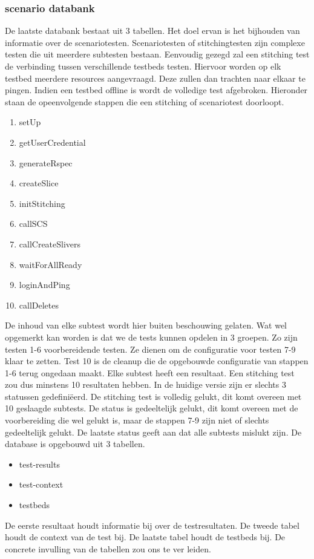\subsubsection{scenario databank}
\npar
De laatste databank bestaat uit 3 tabellen. Het doel ervan is het bijhouden van informatie over de scenariotesten. Scenariotesten of stitchingtesten zijn complexe testen die uit meerdere subtesten bestaan. Eenvoudig gezegd zal een stitching test de verbinding tussen verschillende testbeds testen. Hiervoor worden op elk testbed meerdere resources aangevraagd. Deze zullen dan trachten naar elkaar te pingen. Indien een testbed offline is wordt de volledige test afgebroken. Hieronder staan de opeenvolgende stappen die een stitching of scenariotest doorloopt.
\begin{enumerate}
\item setUp
\item getUserCredential
\item generateRspec
\item createSlice
\item initStitching
\item callSCS
\item callCreateSlivers
\item waitForAllReady
\item loginAndPing
\item callDeletes
\end{enumerate}
De inhoud van elke subtest wordt hier buiten beschouwing gelaten.
Wat wel opgemerkt kan worden is dat we de tests kunnen opdelen in 3 groepen. Zo zijn testen 1-6 voorbereidende testen. Ze dienen om de configuratie voor testen 7-9 klaar te zetten. Test 10 is de cleanup die de opgebouwde configuratie van stappen 1-6 terug ongedaan maakt.
Elke subtest heeft een resultaat. Een stitching test zou dus minstens 10 resultaten hebben. In de huidige versie zijn er slechts 3 statussen gedefini\"eerd. De stitching test is volledig gelukt, dit komt overeen met 10 geslaagde subtests. De status is gedeeltelijk gelukt, dit komt overeen met de voorbereiding die wel gelukt is, maar de stappen 7-9 zijn niet of slechts gedeeltelijk gelukt. De laatste status geeft aan dat alle subtests mislukt zijn.
\npar
De database is opgebouwd uit 3 tabellen.
\begin{itemize}
\item test-results
\item test-context
\item testbeds
\end{itemize}
De eerste resultaat houdt informatie bij over de testresultaten. De tweede tabel houdt de context van de test bij. De laatste tabel houdt de testbeds bij. De concrete invulling van de tabellen zou ons te ver leiden.
\clearpage
